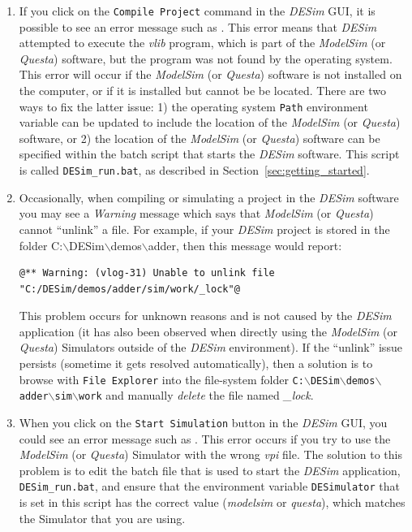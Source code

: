 {\begin{enumerate}
\item If you click on the \texttt{Compile Project} command in the {\it DESim} GUI, it is
possible to see an error message such as 
. This error means that
{\it DESim} attempted to execute the {\it vlib} program, which is part of the 
{\it ModelSim} (or {\it Questa}) software, but the program was not found by the
operating system. This error will occur if the {\it ModelSim} (or {\it Questa}) software 
is not installed on the computer, or if it is installed but cannot be be located. There are 
two ways to fix the latter issue: 1) the operating system \texttt{Path} environment variable 
can be updated to include the location of the {\it ModelSim} (or {\it Questa}) software, 
or 2) the location of the {\it ModelSim} (or {\it Questa}) software can be specified within 
the batch script that starts the {\it DESim} software. This script is called 
\texttt{DESim\_run.bat}, as described in Section~\ref{sec:getting_started}.

\item Occasionally, when compiling or simulating a project in the {\it DESim} software you may
see a {\it Warning} message which says that {\it ModelSim} (or {\it Questa}) cannot 
``unlink'' a file.  For example, if your {\it DESim} project is stored in the folder
C:$\backslash$DESim$\backslash$demos$\backslash$adder, then this message would report: 

\noindent
\begin{minipage}[h]{18 cm}
\begin{lstlisting}[]
@** Warning: (vlog-31) Unable to unlink file "C:/DESim/demos/adder/sim/work/_lock"@
\end{lstlisting}
\end{minipage}

This problem occurs for unknown reasons and is not caused by the {\it DESim} application 
(it has also been observed when directly using the {\it ModelSim} (or {\it Questa}) Simulators
outside of the {\it DESim} environment). 
If the ``unlink'' issue persists (sometime it gets resolved 
automatically), then a solution is to browse with \texttt{File Explorer} into the file-system
folder  
\texttt{C:$\backslash$DESim$\backslash$demos$\backslash$adder$\backslash$sim$\backslash$work}
and manually {\it delete} the file named {\it \_lock}.

\item When you click on the \texttt{Start Simulation} button in the {\it DESim} GUI,
you could see an error message such as .
This error occurs if you try to use the {\it ModelSim} (or {\it Questa}) Simulator with
the wrong {\it vpi} file.  The solution to this problem is to edit the batch file that is
used to start the {\it DESim} application, \texttt{DESim\_run.bat}, and ensure that the
environment variable \texttt{DESimulator} that is set in this script has the correct value
({\it modelsim} or {\it questa}), which matches the Simulator that you are using.


\end{enumerate}}

